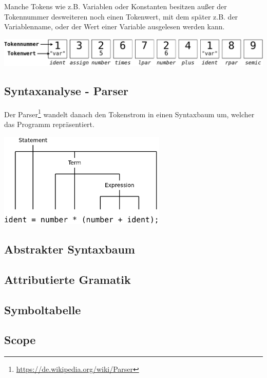 Manche Tokens wie z.B. Variablen oder Konstanten besitzen au\ss{}er der Tokennummer desweiteren noch einen Tokenwert, mit dem sp\"ater z.B. der Variablenname, oder der Wert einer Variable ausgelesen werden kann.

\includegraphics[width=\textwidth]{./media/images/compiler/scanner_tokenstream.png}

\subsection{Syntaxanalyse - Parser}

Der Parser\footnote{\url{https://de.wikipedia.org/wiki/Parser}} wandelt danach den Tokenstrom in einen Syntaxbaum um, welcher das Programm repräsentiert.

\newpage


\includegraphics[width=0.6\textwidth]{./media/images/compiler/parser_syntaxtree.png}

\subsection{Abstrakter Syntaxbaum}

\subsection{Attributierte Gramatik}

\subsection{Symboltabelle}

\subsection{Scope}